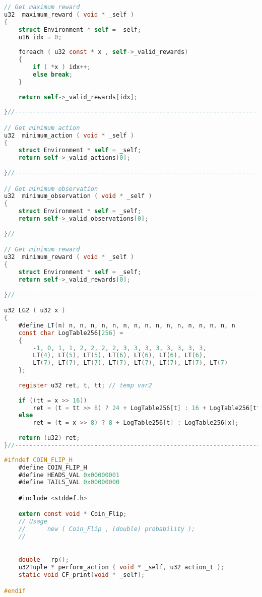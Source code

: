\documentclass[fancychapters]{report}   	%
\begin{document}
\begin{lstlisting}[language=C,caption={environment.c}]
// Get maximum reward
u32  maximum_reward ( void * _self )
{
    struct Environment * self = _self;
    u16 idx = 0;
    
    foreach ( u32 const * x , self->_valid_rewards)
    { 
        if ( *x ) idx++;
        else break;
    }
    
    return self->_valid_rewards[idx];
    
}//-------------------------------------------------------------------

// Get minimum action
u32  minimum_action ( void * _self )
{
    struct Environment * self = _self;
    return self->_valid_actions[0];
    
}//-------------------------------------------------------------------

// Get minimum observation
u32  minimum_observation ( void * _self )
{
    struct Environment * self = _self;
    return self->_valid_observations[0];
    
}//-------------------------------------------------------------------

// Get minimum reward
u32  minimum_reward ( void * _self )
{
    struct Environment * self = _self;
    return self->_valid_rewards[0];
    
}//-------------------------------------------------------------------

u32 LG2 ( u32 x )
{
    #define LT(n) n, n, n, n, n, n, n, n, n, n, n, n, n, n, n, n
    const char LogTable256[256] =
    {
        -1, 0, 1, 1, 2, 2, 2, 2, 3, 3, 3, 3, 3, 3, 3, 3,
        LT(4), LT(5), LT(5), LT(6), LT(6), LT(6), LT(6),
        LT(7), LT(7), LT(7), LT(7), LT(7), LT(7), LT(7), LT(7)
    };
    
    register u32 ret, t, tt; // temp var2
    
    if ((tt = x >> 16))
        ret = (t = tt >> 8) ? 24 + LogTable256[t] : 16 + LogTable256[tt];
    else
        ret = (t = x >> 8) ? 8 + LogTable256[t] : LogTable256[x];
    
    return (u32) ret;
}//--------------------------------------------------------------------
\end{lstlisting}
\begin{lstlisting}[language=C,caption={coin_flip.h}]
#ifndef COIN_FLIP_H
    #define COIN_FLIP_H
    #define HEADS_VAL 0x00000001
    #define TAILS_VAL 0x00000000

    #include <stddef.h>

    extern const void * Coin_Flip; 
    // Usage
    //      new ( Coin_Flip , (double) probability );
    //
    

    double __rp();
    u32Tuple * perform_action ( void * _self, u32 action_t );
    static void CF_print(void * _self);

#endif
\end{lstlisting}
\end{document}
